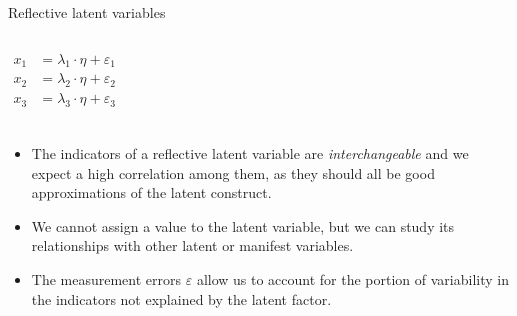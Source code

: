 \documentclass{beamer}
\begin{document}
\begin{frame}{Reflective latent variables}
    \begin{columns}
    \[
    \begin{aligned}
    x_1 &= \lambda_1 \cdot \eta + \varepsilon_1 \\
    x_2 &= \lambda_2 \cdot \eta + \varepsilon_2 \\
    x_3 &= \lambda_3 \cdot \eta + \varepsilon_3 \\
    \end{aligned}
    \]
    \end{columns}
    \vspace{1em}
    \pause
    \small
    \begin{itemize}
        \item The indicators of a reflective latent variable are \textit{interchangeable} and we expect a high correlation among them, as they should all be good approximations of the latent construct.
        \item We cannot assign a value to the latent variable, but we can study its relationships with other latent or manifest variables.
        \item The measurement errors $\varepsilon$ allow us to account for the portion of variability in the indicators not explained by the latent factor.
    \end{itemize}
\end{frame}
\end{document}
